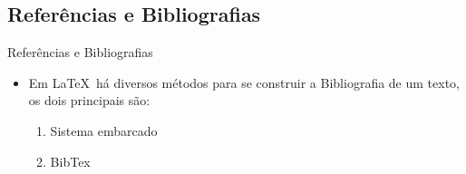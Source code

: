 \subsection{Referências e Bibliografias}
\begin{frame}{Referências e Bibliografias}

  \begin{itemize}
    \item Em \LaTeX\ há diversos métodos para se construir a Bibliografia de um texto, os dois principais são:
 
    \begin{enumerate}
        \item Sistema embarcado
        \item BibTex
    \end{enumerate}
  \end{itemize}

\end{frame}

